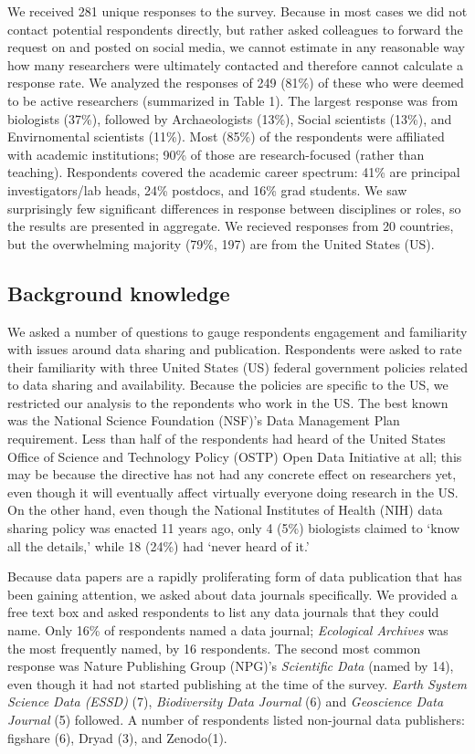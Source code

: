 \documentclass[10pt]{article}
\begin{document}
We received 281 unique responses to the survey.
Because in most cases we did not contact potential respondents directly, but rather asked colleagues to forward the request on and posted on social media, we cannot estimate in any reasonable way how many researchers were ultimately contacted and therefore cannot calculate a response rate.
We analyzed the responses of 249 (81\%) of these who were deemed to be active researchers (summarized in Table 1).
The largest response was from biologists (37\%), followed by Archaeologists (13\%), Social scientists (13\%), and Envirnomental scientists (11\%).
Most (85\%) of the respondents were affiliated with academic institutions; 90\% of those are research-focused (rather than teaching).
Respondents covered the academic career spectrum: 41\% are principal investigators/lab heads, 24\% postdocs, and 16\% grad students.
We saw surprisingly few significant differences in response between disciplines or roles, so the results are presented in aggregate.
We recieved responses from 20 countries, but the overwhelming majority (79\%, 197) are from the United States (US).

\subsection*{Background knowledge}

We asked a number of questions to gauge respondents engagement and familiarity with issues around data sharing and publication.
Respondents were asked to rate their familiarity with three United States (US) federal government policies related to data sharing and availability.
Because the policies are specific to the US, we restricted our analysis to the repondents who work in the US.
The best known was the National Science Foundation (NSF)'s Data Management Plan requirement\cite{national_science_foundation_gpg_2011}.
Less than half of the respondents had heard of the United States Office of Science and Technology Policy (OSTP) Open Data Initiative\cite{obama_making_2013} at all; this may be because the directive has not had any concrete effect on researchers yet, even though it will eventually affect virtually everyone doing research in the US.
On the other hand, even though the National Institutes of Health (NIH) data sharing policy\cite{national_institutes_of_health_final_2003} was enacted 11 years ago, only 4 (5\%) biologists claimed to `know all the details,' while 18 (24\%) had `never heard of it.'

Because data papers are a rapidly proliferating form of data publication that has been gaining attention, we asked about data journals specifically.
We provided a free text box and asked respondents to list any data journals that they could name.
Only 16\% of respondents named a data journal; \emph{Ecological Archives} was the most frequently named, by 16 respondents. 
The second most common response was Nature Publishing Group (NPG)'s \emph{Scientific Data} (named by 14), even though it had not started publishing at the time of the survey.
\emph{Earth System Science Data (ESSD)} (7), \emph{Biodiversity Data Journal} (6) and \emph{Geoscience Data Journal} (5) followed.
A number of respondents listed non-journal data publishers: figshare (6), Dryad (3), and Zenodo(1).
\end{document}
